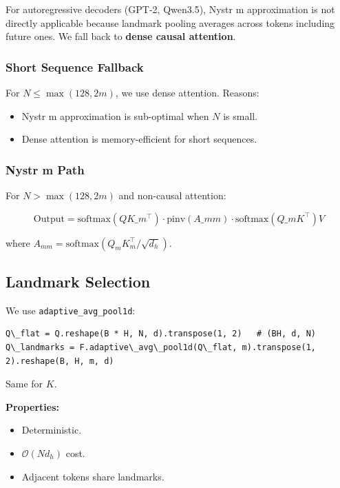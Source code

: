 For autoregressive decoders (GPT-2, Qwen3.5), Nystr m approximation is 
not directly applicable because landmark pooling averages across tokens 
including future ones. We fall back to \textbf{dense causal attention}.

\subsubsection{Short Sequence Fallback}

For $N \leq \max(128, 2m)$, we use dense attention. Reasons:

\begin{itemize}
\item Nystr m approximation is sub-optimal when $N$ is small.
\item Dense attention is memory-efficient for short sequences.

\end{itemize}
\subsubsection{Nystr m Path}

For $N > \max(128, 2m)$ and non-causal attention:

\[
\text{Output} = \text{softmax}(Q K\_m^\top) \cdot \text{pinv}(A\_{mm}) \cdot \text{softmax}(Q\_m K^\top) V
\tag{4.1}
\]

where $A_{mm} = \text{softmax}(Q_m K_m^\top / \sqrt{d_h})$.

\subsection{Landmark Selection}

We use \texttt{adaptive\_avg\_pool1d}:

\begin{lstlisting}
Q\_flat = Q.reshape(B * H, N, d).transpose(1, 2)   # (BH, d, N)
Q\_landmarks = F.adaptive\_avg\_pool1d(Q\_flat, m).transpose(1, 2).reshape(B, H, m, d)
\end{lstlisting}

Same for $K$.

\textbf{Properties:}
\begin{itemize}
\item Deterministic.
\item $\mathcal{O}(N d_h)$ cost.
\item Adjacent tokens share landmarks.

\end{itemize}
